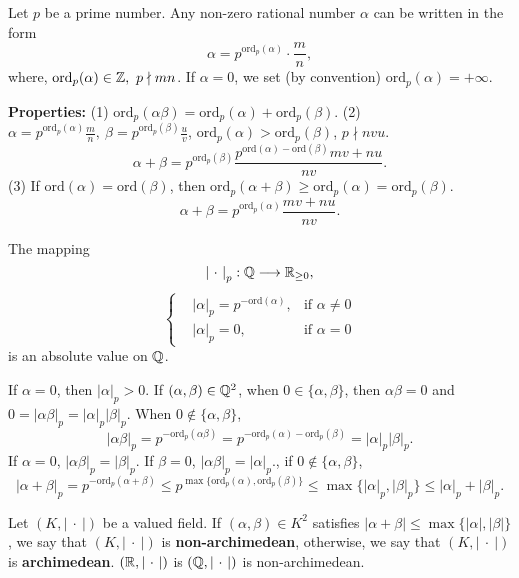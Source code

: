 \begin{exampleenv}
    Let $p$ be a prime number. Any non-zero rational number $\alpha$ can be written in the form
    $$\alpha=p^{\mathrm{ord}_p(\alpha)}\cdot\frac{m}{n},$$
    where, $\mathrm{ord}_p(\alpha)\in \mathbb{Z},\ p\nmid mn$. If $\alpha=0$, we set (by convention) $\mathrm{ord}_p(\alpha)=+\infty.$

    \textbf{Properties:} 
    \newline
    (1) $\mathrm{ord}_p(\alpha\beta)=\mathrm{ord}_p(\alpha)+\mathrm{ord}_p(\beta)$.
    \newline
    (2) $\alpha=p^{\mathrm{ord}_p(\alpha)}\frac{m}{n},\ \beta=p^{\mathrm{ord}_p(\beta)}\frac{u}{v}$, $\mathrm{ord}_p(\alpha)>\mathrm{ord}_p(\beta)$, $p\nmid nvu$.
    $$\alpha+\beta=p^{\mathrm{ord}_p(\beta)}\frac{p^{\mathrm{ord}(\alpha)-\mathrm{ord}(\beta)}mv+nu}{nv}.$$
    (3) If $\mathrm{ord}(\alpha)=\mathrm{ord}(\beta)$, then $\mathrm{ord}_{p}(\alpha+\beta)\ge \mathrm{ord}_p(\alpha)=\mathrm{ord}_p(\beta).$
    $$\alpha+\beta=p^{\mathrm{ord}_p(\alpha)}\frac{mv+nu}{nv}.$$
\end{exampleenv}
\begin{propositionenv}
    The mapping 
    $$\left|\ \cdot\ \right|_{p}: \mathbb{Q}\longrightarrow \mathbb{R}_{\ge 0},$$
    $$\left\{\begin{matrix}
        &|\alpha|_p=p^{-\mathrm{ord}(\alpha)}, &\text{if } \alpha\neq0\\
        &|\alpha|_p=0, &\text{if } \alpha=0
    \end{matrix}\right.$$
    is an absolute value on $\mathbb{Q}$.
\end{propositionenv}
\begin{proofenv}
    If $\alpha=0$, then $|\alpha|_p>0$. If $(\alpha,\beta)\in \mathbb{Q}^2$, when $0\in \{\alpha,\beta\}$, then $\alpha\beta=0$ and $0=|\alpha\beta|_p=|\alpha|_p|\beta|_p$. When $0\notin\{\alpha,\beta\}$, 
    $$|\alpha\beta|_p=p^{-\mathrm{ord}_p(\alpha\beta)}=p^{-\mathrm{ord}_p(\alpha)-\mathrm{ord}_p(\beta)}= |\alpha|_p|\beta|_p.$$
    If $\alpha=0$, $|\alpha\beta|_p= |\beta|_p.$ If $\beta=0$, $|\alpha\beta|_p= |\alpha|_p.$, if $0\notin\{\alpha,\beta\}$,
    $$|\alpha+\beta|_p=p^{-\mathrm{ord}_p(\alpha+\beta)}\le p^{\max\{\mathrm{ord}_p(\alpha),\mathrm{ord}_p(\beta)\}}\le \max\{|\alpha|_p,|\beta|_p\}\le |\alpha|_p+|\beta|_p.$$
\end{proofenv}
\begin{remark}
    Let $(K,\left|\ \cdot\ \right|)$ be a valued field. If $(\alpha,\beta)\in K^2$ satisfies $|\alpha+\beta|\le \max\{|\alpha|,|\beta|\}$, we say that $(K,\left|\ \cdot\ \right|)$ is \textbf{non-archimedean}, otherwise, we say that $(K,\left|\ \cdot\ \right|)$ is \textbf{archimedean}. $(\RR,\left|\ \cdot\ \right|)$ is $(\QQ,\left|\ \cdot\ \right|)$ is non-archimedean.
\end{remark}
